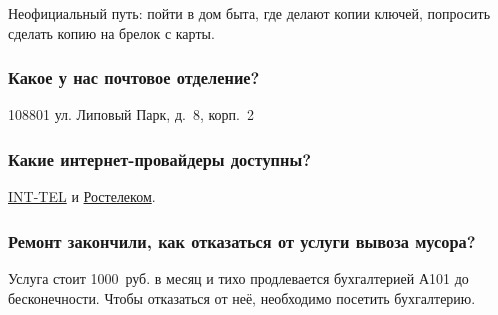 \documentclass[10pt,landscape,a4paper]{article}
\begin{document}
\begin{multicols*}{3}
  Неофициальный путь: пойти в дом быта, где делают копии ключей, попросить сделать копию на брелок с карты.

  \subsubsection*{Какое у нас почтовое отделение?}

  108801 ул. Липовый Парк, д.~8, корп.~2

  \subsubsection*{Какие интернет-провайдеры доступны?}

  \href{http://int-tel.net/}{INT-TEL} и \href{https://moscow.rt.ru/}{Ростелеком}.

  \subsubsection*{Ремонт закончили, как отказаться от услуги вывоза мусора?}

  Услуга стоит 1000~руб. в месяц и тихо продлевается бухгалтерией А101 до бесконечности. Чтобы отказаться от неё, необходимо посетить
  бухгалтерию.

\end{multicols*}
\end{document}
